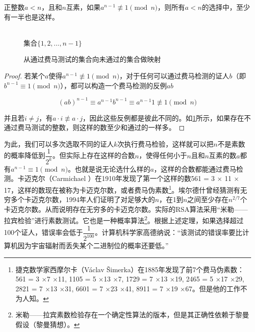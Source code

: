 \documentclass[b5paper]{ctexart}
\begin{document}
\begin{proposition}
正整数$a<n$，且和$n$互素，如果$a^{n-1} \not\equiv 1 \pmod n$，则所有$a<n$的选择中，至少有一半也是这样。
\end{proposition}

\begin{figure}[htbp]
\centering
{} \\
集合$\{1, 2, ..., n-1\}$
\caption{从通过费马测试的集合向未通过的集合做映射}
\label{fig:Fermat-test}
\end{figure}

\begin{proof}
若某个$a$使得$a^{n-1} \not\equiv 1 \pmod n$，对于任何可以通过费马检测的证人$b$（即$b^{n-1} \equiv 1 \pmod n$），都可以构造一个费马检测的反例$ab$

\[
(ab)^{n-1} \equiv a^{n-1}b^{n-1} \equiv a^{n-1}1 \not\equiv 1 \pmod n
\]

并且若$i \neq j$，有$a \cdot i \not\equiv a \cdot j$，因此这些反例都是彼此不同的。如\cref{fig:Fermat-test}所示，如果存在不通过费马测试的整数，则这样的数至少和通过的一样多。
\end{proof}

为此，我们可以多次选取不同的证人$k$次执行费马检验，这样就可以把$n$不是素数的概率降低到$\dfrac{1}{2^k}$。但实际上存在这样的合数$n$，使得任何小于$n$且和$n$互素的数$a$都有$a^{n-1} \equiv 1 \pmod n$。也就是说无论选什么样的$a$，这样的合数都能通过费马检测。卡迈克尔（Carmichael ）在1910年发现了第一个这样的数561 = 3 $\times$ 11 $\times$ 17，这样的数现在被称为卡迈克尔数，或者费马伪素数\footnote{捷克数学家西摩尔卡（Václav Šimerka）在1885年发现了前7个费马伪素数：561 = 3 $\times$7 $\times$11, 1105 = 5 $\times$13 $\times$7, 1729 = 7 $\times$13 $\times$19, 2465 = 5 $\times$17 $\times$29, 2821 = 7 $\times$13 $\times$31, 6601 = 7 $\times$23 $\times$41, 8911 = 7 $\times$19 $\times$67。但是他的工作不为人知。}。埃尔德什曾经猜测有无穷多个卡迈克尔数，1994年人们证明了对足够大的$n$，在1到$n$之间至少存在$n^{2/7}$个卡迈克尔数。从而说明存在无穷多的卡迈克尔数\cite{Carmichael-number}。实际的RSA算法采用“米勒——拉宾检验”进行素数测试。它也是一种概率算法\footnote{米勒——拉宾素数检验存在一个确定性算法的版本，但是其正确性依赖于黎曼假设（黎曼猜想）\cite{Miller-1976}。}。根据上述定理，如果选择超过100个证人，错误率会低于$\dfrac{1}{2^{100}}$。计算机科学家高德纳说：“该测试的错误率要比计算机因为宇宙辐射而丢失某个二进制位的概率还要低。”
\end{document}

